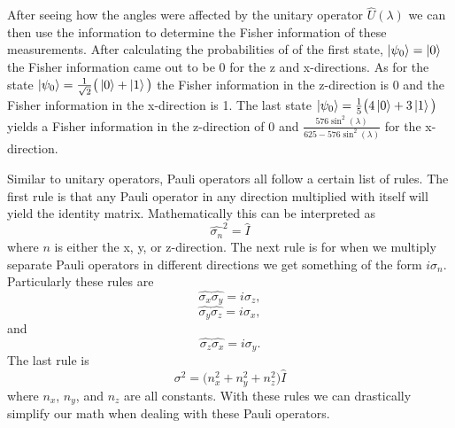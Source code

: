 \documentclass[twocolumn]{article}
\begin{document}
After seeing how the angles were affected by the unitary operator $\hat{U}(\lambda)$ we can then use the information to determine the Fisher information of these measurements. After calculating the probabilities of of the first state, $\ket{\psi_0}=\ket{0}$ the Fisher information came out to be 0 for the z and x-directions. As for the state $\ket{\psi_0}=\frac{1}{\sqrt{2}}\big(\ket{0}+\ket{1}\big)$ the Fisher information in the z-direction is 0 and the Fisher information in the x-direction is 1. The last state $\ket{\psi_0}=\frac{1}{5}\big(4\ket{0}+3\ket{1}\big)$ yields a Fisher information in the z-direction of 0 and $\frac{576\sin^2{(\lambda)}}{625-576\sin^2{(\lambda)}}$ for the x-direction.

Similar to unitary operators, Pauli operators all follow a certain list of rules. The first rule is that any Pauli operator in any direction multiplied with itself will yield the identity matrix. Mathematically this can be interpreted as
\begin{equation}
\hat{\sigma_n}^2=\hat{I}
\end{equation}
where $n$ is either the x, y, or z-direction. The next rule is for when we multiply separate Pauli operators in different directions we get something of the form $i\sigma_n$. Particularly these rules are
\begin{equation}
\hat{\sigma_x}\hat{\sigma_y}=i\sigma_z,
\end{equation}
\begin{equation}
\hat{\sigma_y}\hat{\sigma_z}=i\sigma_x,
\end{equation}
and
\begin{equation}
\hat{\sigma_z}\hat{\sigma_x}=i\sigma_y.
\end{equation}
The last rule is
\begin{equation}
\sigma^2=\big(n_x^2+n_y^2+n_z^2\big)\hat{I}
\end{equation}
where $n_x$, $n_y$, and $n_z$ are all constants. With these rules we can drastically simplify our math when dealing with these Pauli operators.
\end{document}
